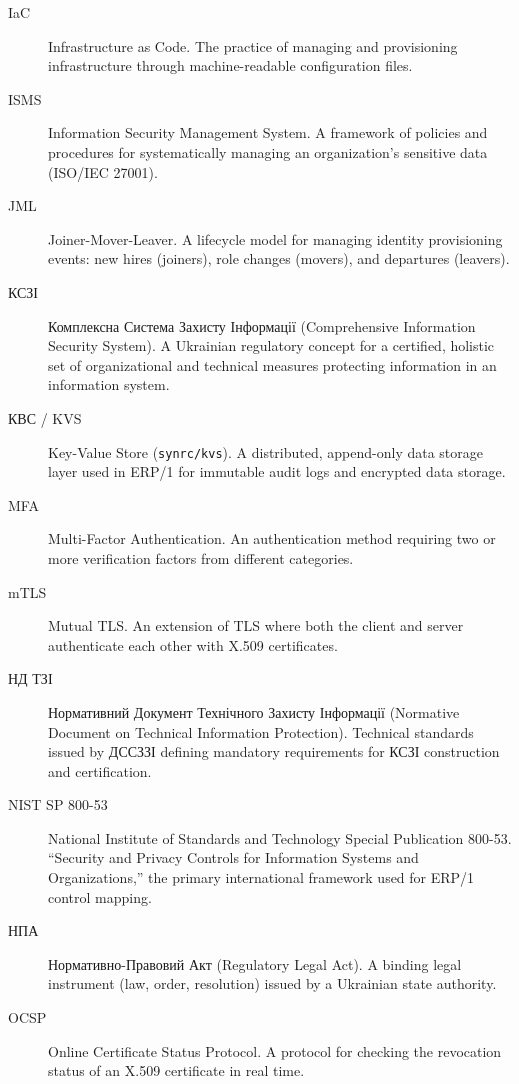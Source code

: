 \documentclass{article}
\begin{document}
\begin{description}
    \item[IaC] Infrastructure as Code. The practice of managing and provisioning infrastructure through machine-readable configuration files.
    \item[ISMS] Information Security Management System. A framework of policies and procedures for systematically managing an organization's sensitive data (ISO/IEC 27001).
    \item[JML] Joiner-Mover-Leaver. A lifecycle model for managing identity provisioning events: new hires (joiners), role changes (movers), and departures (leavers).
    \item[\foreignlanguage{ukrainian}{КСЗІ}] {Комплексна Система Захисту Інформації} (Comprehensive Information Security System). A Ukrainian regulatory concept for a certified, holistic set of organizational and technical measures protecting information in an information system.
    \item[\foreignlanguage{ukrainian}{КВС} / KVS] Key-Value Store (\texttt{synrc/kvs}). A distributed, append-only data storage layer used in ERP/1 for immutable audit logs and encrypted data storage.
    \item[MFA] Multi-Factor Authentication. An authentication method requiring two or more verification factors from different categories.
    \item[mTLS] Mutual TLS. An extension of TLS where both the client and server authenticate each other with X.509 certificates.
    \item[\foreignlanguage{ukrainian}{НД ТЗІ}] {Нормативний Документ Технічного Захисту Інформації} (Normative Document on Technical Information Protection). Technical standards issued by \foreignlanguage{ukrainian}{ДССЗЗІ} defining mandatory requirements for \foreignlanguage{ukrainian}{КСЗІ} construction and certification.
    \item[NIST SP 800-53] National Institute of Standards and Technology Special Publication 800-53. ``Security and Privacy Controls for Information Systems and Organizations,'' the primary international framework used for ERP/1 control mapping.
    \item[\foreignlanguage{ukrainian}{НПА}] {Нормативно-Правовий Акт} (Regulatory Legal Act). A binding legal instrument (law, order, resolution) issued by a Ukrainian state authority.
    \item[OCSP] Online Certificate Status Protocol. A protocol for checking the revocation status of an X.509 certificate in real time.

\end{description}
\end{document}
